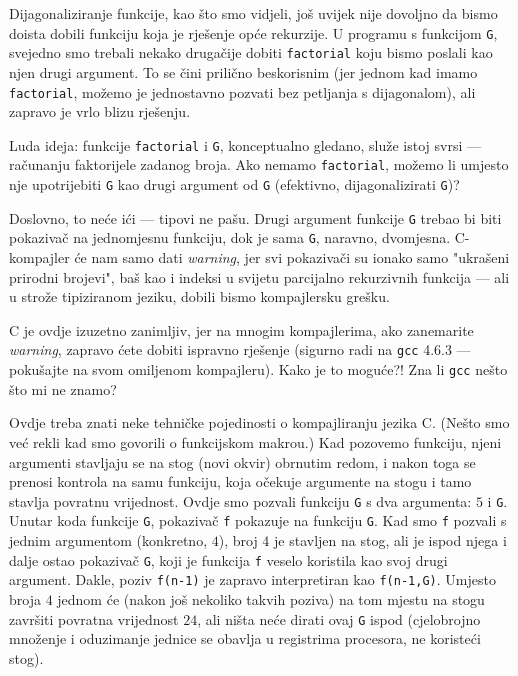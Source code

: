 
Dijagonaliziranje funkcije, kao što smo vidjeli, još uvijek nije dovoljno da bismo doista dobili funkciju koja je rješenje opće rekurzije. U programu s funkcijom \texttt{G}, svejedno smo trebali nekako drugačije dobiti \texttt{factorial} koju bismo poslali kao njen drugi argument. To se čini prilično beskorisnim (jer jednom kad imamo \texttt{factorial}, možemo je jednostavno pozvati bez petljanja s dijagonalom), ali zapravo je vrlo blizu rješenju.

Luda ideja: funkcije \texttt{factorial} i \texttt{G}, konceptualno gledano, služe istoj svrsi --- računanju faktorijele zadanog broja. Ako nemamo \texttt{factorial}, možemo li umjesto nje upotrijebiti \texttt{G} kao drugi argument od \texttt{G} (efektivno, dijagonalizirati \texttt G)?

Doslovno, to neće ići --- tipovi ne pašu. Drugi argument funkcije \texttt{G} trebao bi biti pokazivač na jednomjesnu funkciju, dok je sama \texttt{G}, naravno, dvomjesna. C-kompajler će nam samo dati \emph{warning}, jer svi pokazivači su ionako samo "ukrašeni prirodni brojevi", baš kao i indeksi u svijetu parcijalno rekurzivnih funkcija --- ali u strože tipiziranom jeziku, dobili bismo kompajlersku grešku.

C je ovdje izuzetno zanimljiv, jer na mnogim kompajlerima, ako zanemarite \emph{warning}, zapravo ćete dobiti ispravno rješenje (sigurno radi na \texttt{gcc} 4.6.3 --- pokušajte na svom omiljenom kompajleru). Kako je to moguće?! Zna li \texttt{gcc} nešto što mi ne znamo?

Ovdje treba znati neke tehničke pojedinosti o kompajliranju jezika C. (Nešto smo već rekli kad smo govorili o funkcijskom makrou.) Kad pozovemo funkciju, njeni argumenti stavljaju se na stog (novi okvir) obrnutim redom, i nakon toga se prenosi kontrola na samu funkciju, koja očekuje argumente na stogu i tamo stavlja povratnu vrijednost. Ovdje smo pozvali funkciju \texttt{G} s dva argumenta: $5$ i \texttt{G}. Unutar koda funkcije \texttt{G}, pokazivač \texttt f pokazuje na funkciju \texttt{G}. Kad smo \texttt f pozvali s jednim argumentom (konkretno, $4$), broj $4$ je stavljen na stog, ali je ispod njega i dalje ostao pokazivač \texttt{G}, koji je funkcija \texttt f veselo koristila kao svoj drugi argument. Dakle, poziv \texttt{f(n-1)} je zapravo interpretiran kao \texttt{f(n-1,G)}. Umjesto broja $4$ jednom će (nakon još nekoliko takvih poziva) na tom mjestu na stogu završiti povratna vrijednost $24$, ali ništa neće dirati ovaj \texttt{G} ispod (cjelobrojno množenje i oduzimanje jednice se obavlja u registrima procesora, ne koristeći stog).

